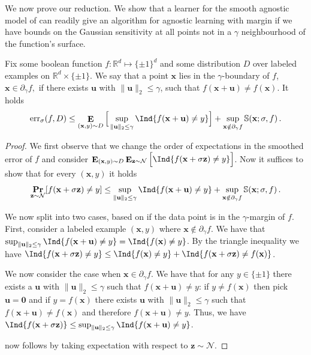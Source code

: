 \documentclass{theoretics}
\newcommand\twonorm[1]{\|#1\|_2}
\renewcommand\vec[1]{\mathbf{#1}}
\DeclareMathOperator*{\pr}{\mathbf{Pr}}
\DeclareMathOperator*{\E}{\mathbf{E}}
\newcommand{\normal}{\mathcal{N}}
\newcommand{\err}{\mathrm{err}}
\newcommand{\R}{\mathbb{R}}
\newcommand{\1}{\Ind}
\newcommand{\x}{\vec x}
\newcommand{\vu}{\vec u}
\newcommand{\z}{\vec z}
\newcommand{\Gauss}{\mathcal{N}}
\newcommand{\Djoint}{D}
\begin{document}
We now prove our reduction. We show that a learner for the smooth agnostic model of  can readily give an algorithm for agnostic learning with margin if we have bounds on the Gaussian sensitivity at all points not in a $\gamma$ neighbourhood of the function's surface.

\begin{lemma}
\label{lem:margin_smooth}
Fix some boolean function $f:\R^d\mapsto \{\pm 1\}^d$ and some distribution $D$ over labeled
examples on $\R^d \times \{ \pm 1\}$.
We say that a point $\x$ lies in the $\gamma$-boundary of $f$, $\x \in \partial_\gamma f, $ 
if there exists $\vec u$ with $\|\vec u \|_2 \leq \gamma$, such that
$f(\x + \vec u) \neq f(\x)$. 
It holds
\[
\err_{\sigma}(f,D)
         \leq 
        \E_{(\x, y) \sim \Djoint}\Big[ \sup_{\|\vec u\|_2 \leq \gamma} \1\{f(\x + \vec u) \neq y \} \Big] 
         + \sup_{\x \notin \partial_\gamma f}
         \mathbb S(\x;\sigma, f)\,.
\]
\end{lemma}
\begin{proof}
We first observe that we change the order of expectations in the smoothed error of $f$ 
and consider 
        $
        \E_{(\x,y) \sim \Djoint}
        \E_{\z \sim \normal}
         \Big[\1\{f(\x + \sigma \vec z) \neq y \} \Big] 
         $.
         Now it suffices to show that for every $(\x, y)$ it holds
         \begin{equation}
         \label{eqn:eq:smooth_vs_margin}
         \pr_{\z \sim \normal}[f(\x+ \sigma \vec z) \neq y]
         \leq 
         \sup_{\|\vec u\|_2 \leq \gamma} \1\{f(\x + \vec u) \neq y\}
         + \sup_{\x \notin \partial_\gamma f} \mathbb S(\x; \sigma, f) \,.
         \end{equation}

         We now split into two cases, based on if the data point is in the $\gamma$-margin of $f$. First, consider a labeled example $(\x, y)$ where $\x \notin \partial_\gamma f$.   We have that 
         $\sup_{\|\vec u\|_2 \leq \gamma} \1\{f(\x+\vec u) \neq y\} = 
         \1\{f(\x) \neq y\} $. By the triangle inequality we have 
         $\1\{ f(\x + \sigma \vec z) \neq y \} 
         \leq  \1\{ f(\x) \neq y \}+ \1\{f(\x + \sigma \vec z) \neq f(\x)\}$. 

         We now consider the case when $\x\in \partial_\gamma f$.
         We 
         have that for any $y \in \{\pm 1\}$ there exists a $\vec u$ with $\|\vec u\|_2 \leq \gamma$ such that $f(\x + \vec u) \neq y$: if $y \neq f(\x)$ then pick $\vec u = \vec 0$ and if $y = f(\x)$ there exists $\vec u$ with $\|\vec u\|_2 \leq \gamma$ such that $f(\x + \vec u) \neq f(\x)$ and therefore $f(\x + \vec u) \neq y$.  Thus, we have $\1\{f(\x+\sigma \z)\}\leq \sup_{\twonorm{\vu}\leq \gamma}\1\{f(\x+\vu)\neq y\}$.
         
         now follows by taking expectation with respect to $\vec z\sim \Gauss$.
\end{proof}
\end{document}
